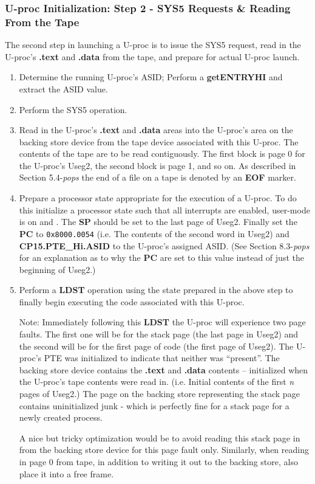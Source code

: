 \subsubsection{U-proc Initialization: Step 2 - SYS5 Requests \& Reading From the Tape}
The second step in launching a U-proc is to issue the SYS5 request, read in the U-proc's \textbf{.text} and \textbf{.data} from the tape, and prepare for actual U-proc launch.
\begin{enumerate}
\item Determine the running U-proc's ASID; Perform a \textbf{getENTRYHI} and extract the ASID value.
\item Perform the SYS5 operation.
\item Read in the U-proc's \textbf{.text} and \textbf{.data} areas into the U-proc's area on the backing store device from the tape device associated with this U-proc. 
The contents of the tape are to be read contiguously. 
The first block is page 0 for the U-proc's Useg2, the second block is page 1, and so on. 
As described in Section 5.4-\emph{pops} the end of a file on a tape is denoted by an \textbf{EOF} marker.
\item Prepare a processor state appropriate for the execution of a U-proc. 
To do this initialize a processor state such that all interrupts are enabled, user-mode is on and \vmon{}. 
The \textbf{SP} should be set to the last page of Useg2. 
Finally set the \textbf{PC} to \texttt{0x8000.0054} (i.e. The contents of the second word in Useg2) and \textbf{CP15.PTE\_Hi.ASID} to the U-proc's assigned ASID. %
(See Section 8.3-\emph{pops} for an explanation as to why the \textbf{PC} are set to this value instead of just the beginning of Useg2.)
\item Perform a \textbf{LDST} operation using the state prepared in the above step to finally begin executing the code associated with this U-proc.

Note: Immediately following this \textbf{LDST} the U-proc will experience two page faults. 
The first one will be for the stack page (the last page in Useg2) and the second will be for the first page of code (the first page of Useg2).
The U-proc's PTE was initialized to indicate that neither was ``present''.
The backing store device contains the \textbf{.text} and \textbf{.data} contents – initialized when the U-proc's tape contents were read in. 
(i.e. Initial contents of the first \emph{n} pages of Useg2.) 
The page on the backing store representing the stack page contains uninitialized junk - which is perfectly fine for a stack page for a newly created process.

A nice but tricky optimization would be to avoid reading this stack page in from the backing store device for this page fault only. 
Similarly, when reading in page 0 from tape, in addition to writing it out to the backing store, also place it into a free frame.
\end{enumerate}



